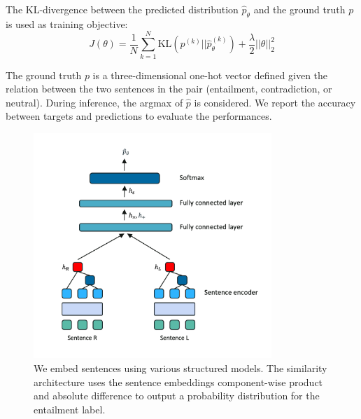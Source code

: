 The KL-divergence between the predicted distribution $\hat{p}_{\theta}$ and the ground truth $p$ is used as training objective:
\begin{equation}
J(\theta) = \frac{1}{N}\sum_{k=1}^{N}\text{KL}(p^{(k)} \Big|\Big| \hat{p}_{\theta}^{(k)}) + \frac{\lambda}{2}||\theta||_{2}^{2}
\end{equation}

The ground truth $p$ is a three-dimensional one-hot vector defined given the relation between the two sentences in the pair (entailment, contradiction, or neutral). During inference, the argmax of $\hat{p}$ is considered. We report the accuracy between targets and predictions to evaluate the performances.



\begin{figure}[!htb]
\begin{center}
\includegraphics[width=9cm]{images/similarity.png}
\end{center}
\caption{We embed sentences using various structured models. The similarity architecture uses the sentence embeddings component-wise product and absolute difference to output a probability distribution for the entailment label.}
\end{figure}

